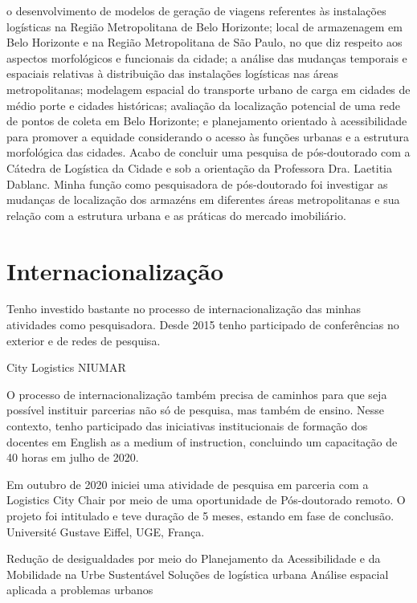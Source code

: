 \documentclass[
]{book}
\begin{document}
o desenvolvimento de modelos de geração de viagens referentes às instalações logísticas na Região Metropolitana de Belo Horizonte; local de armazenagem em Belo Horizonte e na Região Metropolitana de São Paulo, no que diz respeito aos aspectos morfológicos e funcionais da cidade; a análise das mudanças temporais e espaciais relativas à distribuição das instalações logísticas nas áreas metropolitanas; modelagem espacial do transporte urbano de carga em cidades de médio porte e cidades históricas; avaliação da localização potencial de uma rede de pontos de coleta em Belo Horizonte; e planejamento orientado à acessibilidade para promover a equidade considerando o acesso às funções urbanas e a estrutura morfológica das cidades. Acabo de concluir uma pesquisa de pós-doutorado com a Cátedra de Logística da Cidade e sob a orientação da Professora Dra. Laetitia Dablanc. Minha função como pesquisadora de pós-doutorado foi investigar as mudanças de localização dos armazéns em diferentes áreas metropolitanas e sua relação com a estrutura urbana e as práticas do mercado imobiliário.

\hypertarget{internacionalizauxe7uxe3o}{%
\section{Internacionalização}\label{internacionalizauxe7uxe3o}}

Tenho investido bastante no processo de internacionalização das minhas atividades como pesquisadora. Desde 2015 tenho participado de conferências no exterior e de redes de pesquisa.

City Logistics NIUMAR

O processo de internacionalização também precisa de caminhos para que seja possível instituir parcerias não só de pesquisa, mas também de ensino. Nesse contexto, tenho participado das iniciativas institucionais de formação dos docentes em English as a medium of instruction, concluindo um capacitação de 40 horas em julho de 2020.

Em outubro de 2020 iniciei uma atividade de pesquisa em parceria com a Logistics City Chair por meio de uma oportunidade de Pós-doutorado remoto. O projeto foi intitulado e teve duração de 5 meses, estando em fase de conclusão. Université Gustave Eiffel, UGE, França.

Redução de desigualdades por meio do Planejamento da Acessibilidade e da Mobilidade na Urbe Sustentável Soluções de logística urbana Análise espacial aplicada a problemas urbanos
\end{document}
